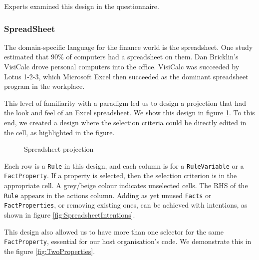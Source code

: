 Experts examined this design in the questionnaire.

\subsubsection{SpreadSheet}

The domain-specific language for the finance world is the spreadsheet.
One study estimated that 90\% of computers had a spreadsheet on them\cite{bradley2009using}.
Dan Bricklin's VisiCalc drove personal computers into the office.
VisiCalc was succeeded by Lotus 1-2-3, which Microsoft Excel then succeeded as the dominant spreadsheet program in the workplace.

This level of familiarity with a paradigm led us to design a projection that had the look and feel of an Excel spreadsheet.
We show this design in figure \ref{fig:SpreadsheetProjection}.
To this end, we created a design where the selection criteria could be directly edited in the cell, as highlighted in the figure.

\begin{figure}[h]
    \centering
    \caption{Spreadsheet projection}
    \label{fig:SpreadsheetProjection}
\end{figure}

Each row is a \texttt{Rule} in this design, and each column is for a \texttt{RuleVariable} or a \texttt{FactProperty}.
If a property is selected, then the selection criterion is in the appropriate cell.
A grey/beige colour indicates unselected cells.
The RHS of the \texttt{Rule} appears in the actions column.
Adding as yet unused \texttt{Facts} or \texttt{FactProperties}, or removing existing ones, can be achieved with intentions, as shown in figure \ref{fig:SpreadsheetIntentions}.

This design also allowed us to have more than one selector for the same \texttt{FactProperty}, essential for our host organisation's code.
We demonstrate this in the figure \ref{fig:TwoProperties}.

